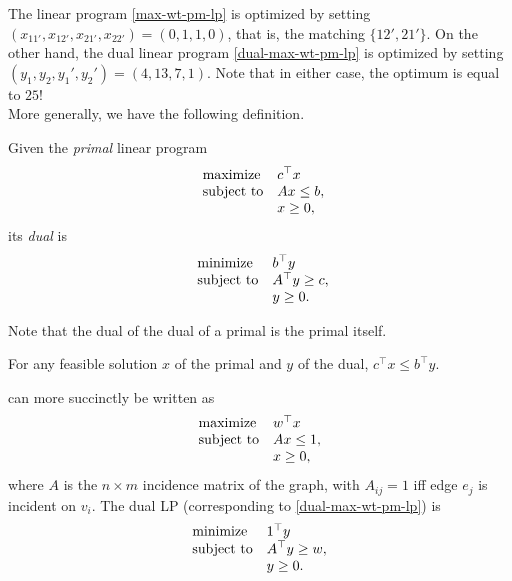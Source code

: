 	The linear program \eqref{max-wt-pm-lp} is optimized by setting $(x_{11'},x_{12'},x_{21'},x_{22'}) = (0,1,1,0)$, that is, the matching $\{12',21'\}$. On the other hand, the dual linear program \eqref{dual-max-wt-pm-lp} is optimized by setting $(y_1,y_2,y_1',y_2') = (4,13,7,1)$. Note that in either case, the optimum is equal to $25$! \\

	More generally, we have the following definition.

	\begin{fdef}
		\label{def:dual}
		Given the \emph{primal} linear program
		\[
		\begin{array}{ll@{}ll}
		\text{maximize}  & \displaystyle c^\top x \\
		\text{subject to} \displaystyle &Ax \le b,\\
		                  &x \ge 0,
		\end{array}
		\]
		its \emph{dual} is
		\[
		\begin{array}{ll@{}ll}
		\text{minimize}  & \displaystyle b^\top y \\
		\text{subject to} \displaystyle &A^\top y \ge c,\\
		                  &y \ge 0.
		\end{array}
		\]
	\end{fdef}

	Note that the dual of the dual of a primal is the primal itself.

	\begin{fprop}
		For any feasible solution $x$ of the primal and $y$ of the dual, $c^\top x \le b^\top y$.
	\end{fprop}



	 can more succinctly be written as
	\[
	\label{max-wt-pm-lp-2}
	\begin{array}{ll@{}ll}
	\text{maximize}  & w^\top x &\\
	\text{subject to}& \displaystyle Ax \le 1, \\
	                 & x \ge 0,
	\end{array}
	\]
	where $A$ is the $n \times m$ incidence matrix of the graph, with $A_{ij} = 1$ iff edge $e_j$ is incident on $v_i$. The dual LP (corresponding to \cref{dual-max-wt-pm-lp}) is
	\[
	\begin{array}{ll@{}ll}
	\text{minimize}  & 1^\top y &\\
	\text{subject to}& \displaystyle A^\top y \ge w, \\
	                 & y \ge 0.
	\end{array}
	\]

